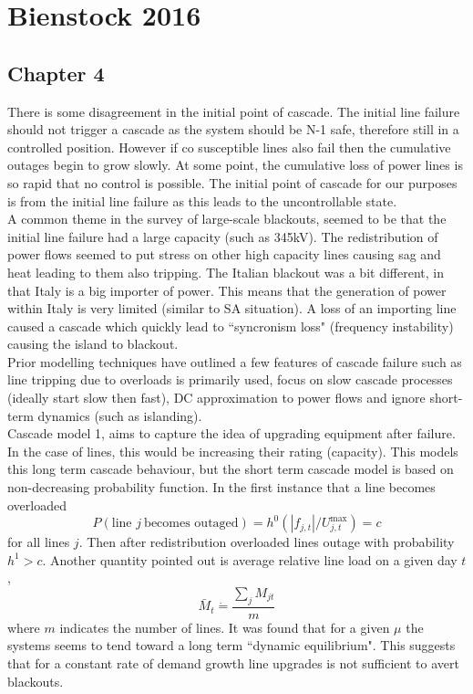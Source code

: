 \documentclass{article}
\begin{document}
\section{Bienstock 2016}
\subsection{Chapter 4}

There is some disagreement in the initial point of cascade. The initial line failure should not trigger a cascade as the system should be N-1 safe, therefore still in a controlled position. However if co susceptible lines also fail then the cumulative outages begin to grow slowly. At some point, the cumulative loss of power lines is so rapid that no control is possible. The initial point of cascade for our purposes is from the initial line failure as this leads to the uncontrollable state.\\

A common theme in the survey of large-scale blackouts, seemed to be that the initial line failure had a large capacity (such as 345kV). The redistribution of power flows seemed to put stress on other high capacity lines causing sag and heat leading to them also tripping. The Italian blackout was a bit different, in that Italy is a big importer of power. This means that the generation of power within Italy is very limited (similar to SA situation). A loss of an importing line caused a cascade which quickly lead to ``syncronism loss" (frequency instability) causing the island to blackout.\\

Prior modelling techniques have outlined a few features of cascade failure such as line tripping due to overloads is primarily used, focus on slow cascade processes (ideally start slow then fast), DC approximation to power flows and ignore short-term dynamics (such as islanding). \\

Cascade model 1, aims to capture the idea of upgrading equipment after failure. In the case of lines, this would be increasing their rating (capacity). This models this long term cascade behaviour, but the short term cascade model is based on non-decreasing probability function. In the first instance that a line becomes overloaded
\begin{equation}
P(\text{line } j \ \text{becomes outaged}) = h^0(|f_{j,t}|/U_{j,t}^{\text{max}})=c
\end{equation}
for all lines $j$. Then after redistribution overloaded lines outage with probability $h^1>c$. Another quantity pointed out is average relative line load on a given day $t$,
\begin{equation}
\bar{M}_t \dot{=}\frac{\sum_j M_{jt}}{m}
\end{equation}
where $m$ indicates the number of lines. It was found that for a given $\mu$ the systems seems to tend toward a long term ``dynamic equilibrium". This suggests that for a constant rate of demand growth line upgrades is not sufficient to avert blackouts.\\
\end{document}
